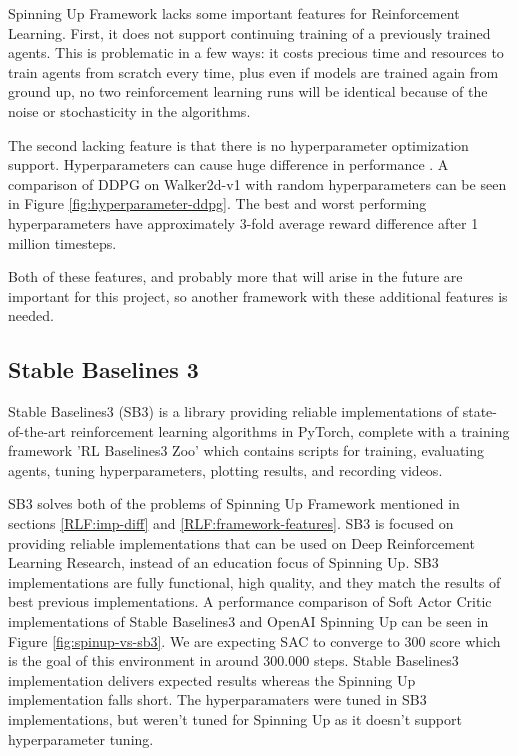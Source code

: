 Spinning Up Framework lacks some important features for Reinforcement Learning. First, it does not support continuing training of a previously trained agents. This is problematic in a few ways: it costs precious time and resources to train agents from scratch every time, plus even if models are trained again from ground up, no two reinforcement learning runs will be identical because of the noise or stochasticity in the algorithms.

The second lacking feature is that there is no hyperparameter optimization support. Hyperparameters can cause huge difference in performance \cite{hyperparameter-ddpg}. A comparison of DDPG on Walker2d-v1 with random hyperparameters can be seen in Figure \ref{fig:hyperparameter-ddpg}. The best and worst performing hyperparameters have approximately 3-fold average reward difference after 1 million timesteps.

Both of these features, and probably more that will arise in the future are important for this project, so another framework with these additional features is needed.


\subsection{Stable Baselines 3}
Stable Baselines3 (SB3) is a library providing reliable implementations of state-of-the-art reinforcement learning algorithms in PyTorch, complete with a training framework 'RL Baselines3 Zoo' which contains scripts for training, evaluating agents, tuning hyperparameters, plotting results, and recording videos. \cite{stable-baselines3} 

SB3 solves both of the problems of Spinning Up Framework mentioned in sections \ref{RLF:imp-diff} and \ref{RLF:framework-features}. SB3 is focused on providing reliable implementations that can be used on Deep Reinforcement Learning Research, instead of an education focus of Spinning Up. SB3 implementations are fully functional, high quality, and they match the results of best previous implementations. A performance comparison of Soft Actor Critic implementations of Stable Baselines3 and OpenAI Spinning Up can be seen in Figure \ref{fig:spinup-vs-sb3}. We are expecting SAC to converge to 300 score which is the goal of this environment \cite{Bipedal-Walker-v2} in around 300.000 steps. \cite{gym-leaderboard} Stable Baselines3 implementation delivers expected results whereas the Spinning Up implementation falls short. The hyperparamaters were tuned in SB3 implementations, but weren't tuned for Spinning Up as it doesn't support hyperparameter tuning.

